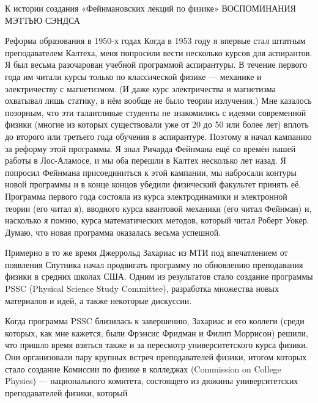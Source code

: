 \documentclass[11pt,oneside]{article}
\begin{document}
\label{tips-sec-5-о-происхождении-фейнмановских-лекций-по-физике-мемуары-мэтью-сэндса}


К истории создания «Фейнмановских лекций по физике» ВОСПОМИНАНИЯ МЭТТЬЮ СЭНДСА\par



Реформа образования в 1950-х годах Когда в 1953 году я впервые стал штатным преподавателем Калтеха, меня попросили вести несколько курсов для аспирантов. Я был весьма разочарован учебной программой аспирантуры. В течение первого года им читали курсы только по классической физике --- механике и электричеству с магнетизмом. (И даже курс электричества и магнетизма охватывал лишь статику, в нём вообще не было теории излучения.) Мне казалось позорным, что эти талантливые студенты не знакомились с идеями современной физики (многие из которых существовали уже от 20 до 50 или более лет) вплоть до второго или третьего года обучения в аспирантуре. Поэтому я начал кампанию за реформу этой программы. Я знал Ричарда Фейнмана ещё со времён нашей работы в Лос-Аламосе, и мы оба перешли в Калтех несколько лет назад. Я попросил Фейнмана присоединиться к этой кампании, мы набросали контуры новой программы и в конце концов убедили физический факультет принять её. Программа первого года состояла из курса электродинамики и электронной теории (его читал я), вводного курса квантовой механики (его читал Фейнман) и, насколько я помню, курса математических методов, который читал Роберт Уокер. Думаю, что новая программа оказалась весьма успешной.\par



Примерно в то же время Джеррольд Захариас из МТИ под впечатлением от появления Спутника начал продвигать программу по обновлению преподавания физики в средних школах США. Одним из результатов стало создание программы PSSC (Physical Science Study Committee), разработка множества новых материалов и идей, а также некоторые дискуссии.\par



Когда программа PSSC близилась к завершению, Захариас и его коллеги (среди которых, как мне кажется, были Фрэнсис Фридман и Филип Моррисон) решили, что пришло время взяться также и за пересмотр университетского курса физики. Они организовали пару крупных встреч преподавателей физики, итогом которых стало создание Комиссии по физике в колледжах (Commission on College Physics) --- национального комитета, состоящего из дюжины университетских преподавателей физики, который\par
\end{document}
